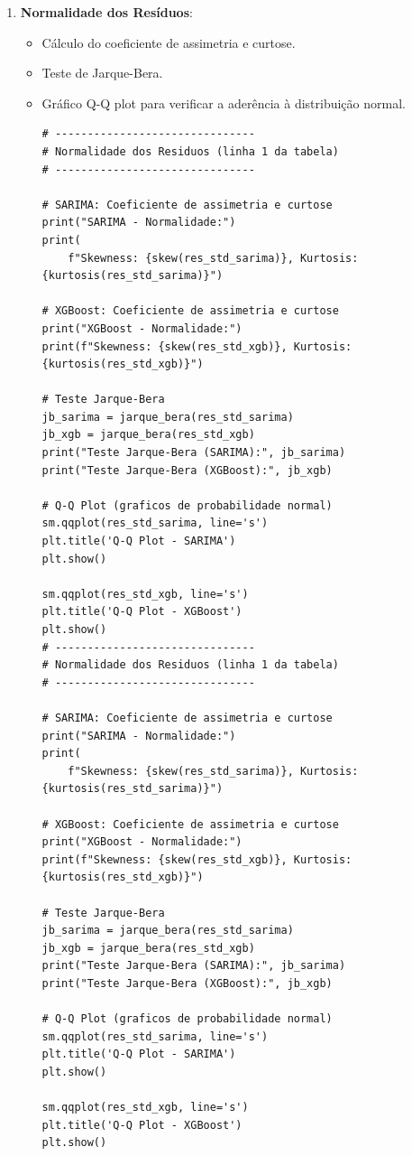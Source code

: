 \documentclass[a4paper, 12pt]{article}
\begin{document}
\begin{enumerate}
    \item \textbf{Normalidade dos Resíduos}:
    \begin{itemize}
        \item Cálculo do coeficiente de assimetria e curtose.
        \item  Teste de Jarque-Bera.
        \item Gráfico Q-Q plot para verificar a aderência à distribuição normal.

        \begin{lstlisting}[style=python]
# -------------------------------
# Normalidade dos Residuos (linha 1 da tabela)
# -------------------------------

# SARIMA: Coeficiente de assimetria e curtose
print("SARIMA - Normalidade:")
print(
    f"Skewness: {skew(res_std_sarima)}, Kurtosis: {kurtosis(res_std_sarima)}")

# XGBoost: Coeficiente de assimetria e curtose
print("XGBoost - Normalidade:")
print(f"Skewness: {skew(res_std_xgb)}, Kurtosis: {kurtosis(res_std_xgb)}")

# Teste Jarque-Bera
jb_sarima = jarque_bera(res_std_sarima)
jb_xgb = jarque_bera(res_std_xgb)
print("Teste Jarque-Bera (SARIMA):", jb_sarima)
print("Teste Jarque-Bera (XGBoost):", jb_xgb)

# Q-Q Plot (graficos de probabilidade normal)
sm.qqplot(res_std_sarima, line='s')
plt.title('Q-Q Plot - SARIMA')
plt.show()

sm.qqplot(res_std_xgb, line='s')
plt.title('Q-Q Plot - XGBoost')
plt.show()
# -------------------------------
# Normalidade dos Residuos (linha 1 da tabela)
# -------------------------------

# SARIMA: Coeficiente de assimetria e curtose
print("SARIMA - Normalidade:")
print(
    f"Skewness: {skew(res_std_sarima)}, Kurtosis: {kurtosis(res_std_sarima)}")

# XGBoost: Coeficiente de assimetria e curtose
print("XGBoost - Normalidade:")
print(f"Skewness: {skew(res_std_xgb)}, Kurtosis: {kurtosis(res_std_xgb)}")

# Teste Jarque-Bera
jb_sarima = jarque_bera(res_std_sarima)
jb_xgb = jarque_bera(res_std_xgb)
print("Teste Jarque-Bera (SARIMA):", jb_sarima)
print("Teste Jarque-Bera (XGBoost):", jb_xgb)

# Q-Q Plot (graficos de probabilidade normal)
sm.qqplot(res_std_sarima, line='s')
plt.title('Q-Q Plot - SARIMA')
plt.show()

sm.qqplot(res_std_xgb, line='s')
plt.title('Q-Q Plot - XGBoost')
plt.show()
    

\end{lstlisting}
\end{itemize}
\end{enumerate}
\end{document}
